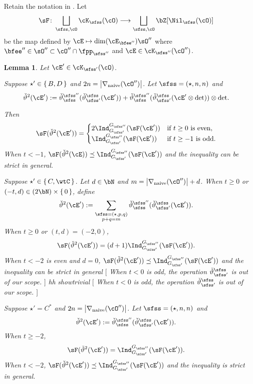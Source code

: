 \documentclass[12pt,a4paper]{amsart}
\newcommand{\trivial}[2][]{\if\relax\detokenize{#1}\relax
  {%
      \color{orange} \vspace{0em} $[$  #2 $]$
      \color{black}
  }
  \else
\ifx#1h
\ifcsname showtrivial\endcsname
{%
    \color{orange} \vspace{0em}  $[$ #2 $]$
    \color{black}
}
\fi
\else {\red Wrong argument!} \fi
\fi
}
\def\abs#1{\left|{#1}\right|}
\def\DD{\nabla}
\numberwithin{equation}{section}
\newtheorem{lem}[thm]{Lemma}
\theoremstyle{remark}
\def\DDn{\DD_{\mathrm{naive}}}
\def\cOpp{\cO^{\prime\prime}}
\begin{document}
Retain the notation in .
Let 
\[
  \sF\colon \bigsqcup_{\sfss,\cO} \cK_{\sfss}(\cO)\longrightarrow 
  \bigsqcup_{\sfss,\cO} \bZ[ \Nil_{\sfss}(\cO) ] 
  \]
  be the map defined  by $\cE \mapsto \dim (\cE_{\bfee''})\sO''$ where 
$\bfee''\in \sO'' \subset \cO''\cap \fpp_{\sfss''}$ and
$\cE\in \cK_{\sfss''}(\cO'')$.

\def\dblift{{\check \vartheta^2}}

\begin{lem}\label{lem:dblift} 
  Let  $\cE' \in \cK_{\sfss'}(\cO)$.
  \begin{enuma}
 \item Suppose $\star' \in \set{B,D}$ and  $2n = \abs{\DDn(\cOpp)}$.
 Let $\sfss = (\star, n,n)$ and 
 \[
   \dblift(\cE') := \dlift_{\sfss}^{\sfss''}(\dlift_{\sfss'}^{\sfss}(\cE'))
   + \dlift_{\sfss}^{\sfss''}(\dlift_{\sfss'}^{\sfss}
   (\cE' \otimes {\det}))\otimes {\det}.
   \]    

  Then     
  \[
    \sF(\dblift(\cE')) = \begin{cases}
     2 \indsss(\sF(\cE')) & \text{if $t\geq 0$ is even},\\ 
     \indsss(\sF(\cE')) & \text{if $t\geq -1$ is odd}.\\ 
    \end{cases}
  \]
  When $t <-1$, $\sF(\dblift(\cE)) \preceq \indsss(\sF(\cE'))$ and the inequality 
  can be strict in general.

 \item Suppose $\star' \in \set{C,\wtC}$. 
  Let $d\in \bN$ and $m = \abs{\DDn(\cOpp)}+d$.
  When $t\geq 0$ or $(-t,d) \in (2\bN)\times \set{0}$, define 
 \[
   \dblift(\cE') := 
   \sum_{\substack{\sfss = (\star,p,q)\\ p+q=m}}
   \dlift_{\sfss}^{\sfss''}(\dlift_{\sfss'}^{\sfss}(\cE')).
   \]    
   When $t\geq 0$ or $(t,d)=(-2,0)$,\\
  \[
    \sF(\dblift(\cE')) = (d+1) \indsss(\sF(\cE')).
  \]
   When $t< -2$ is even and $d=0$, 
    $\sF(\dblift(\cE')) \preceq \indsss(\sF(\cE'))$  and the inequality can be strict
    in general 
  \trivial[h]{
    When $t<0$ is odd, the operation $\dlift_{\sfss'}^{\sfss}$ is out 
    of our scope. 
  }

 \item Suppose $\star' = C^*$ and $2n = \abs{\DDn(\cOpp)}$. 
  Let $\sfss = (\star,n,n)$ and 
 \[
   \dblift(\cE') := 
      \dlift_{\sfss}^{\sfss''}(\dlift_{\sfss'}^{\sfss}(\cE')).
   \]    
  When $t\geq -2$, 
  \[
    \sF(\dblift(\cE')) = \indsss(\sF(\cE')). 
  \]
  When $t <-2$, $\sF(\dblift(\cE')) \preceq \indsss(\sF(\cE'))$ and the inequality 
  is strict in general.


\end{enuma}
\end{lem}
\end{document}
